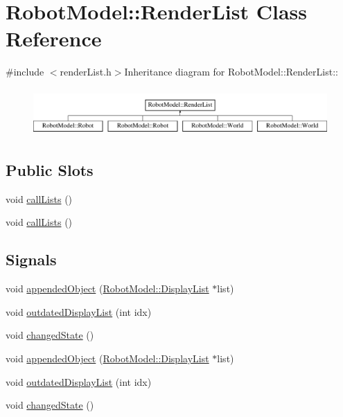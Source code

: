 \hypertarget{class_robot_model_1_1_render_list}{
\section{RobotModel::RenderList Class Reference}
\label{class_robot_model_1_1_render_list}
}


{\ttfamily \#include $<$renderList.h$>$}Inheritance diagram for RobotModel::RenderList::\begin{figure}[H]
\begin{center}
\leavevmode
\includegraphics[height=1.83007cm]{class_robot_model_1_1_render_list}
\end{center}
\end{figure}
\subsection*{Public Slots}
\begin{DoxyCompactItemize}
\item 
void \hyperlink{class_robot_model_1_1_render_list_a7cd62d6e6376bc02bd4244dcc174b465}{callLists} ()
\item 
void \hyperlink{class_robot_model_1_1_render_list_a7cd62d6e6376bc02bd4244dcc174b465}{callLists} ()
\end{DoxyCompactItemize}
\subsection*{Signals}
\begin{DoxyCompactItemize}
\item 
void \hyperlink{class_robot_model_1_1_render_list_a635908222fa71402918e31eb2d725844}{appendedObject} (\hyperlink{class_robot_model_1_1_display_list}{RobotModel::DisplayList} $\ast$list)
\item 
void \hyperlink{class_robot_model_1_1_render_list_a22724d5d6878f19b639b5b6b16963ee2}{outdatedDisplayList} (int idx)
\item 
void \hyperlink{class_robot_model_1_1_render_list_a9ad71d6ea6d0d1008e0705ced20f6aea}{changedState} ()
\item 
void \hyperlink{class_robot_model_1_1_render_list_a635908222fa71402918e31eb2d725844}{appendedObject} (\hyperlink{class_robot_model_1_1_display_list}{RobotModel::DisplayList} $\ast$list)
\item 
void \hyperlink{class_robot_model_1_1_render_list_a22724d5d6878f19b639b5b6b16963ee2}{outdatedDisplayList} (int idx)
\item 
void \hyperlink{class_robot_model_1_1_render_list_a9ad71d6ea6d0d1008e0705ced20f6aea}{changedState} ()
\end{DoxyCompactItemize}
